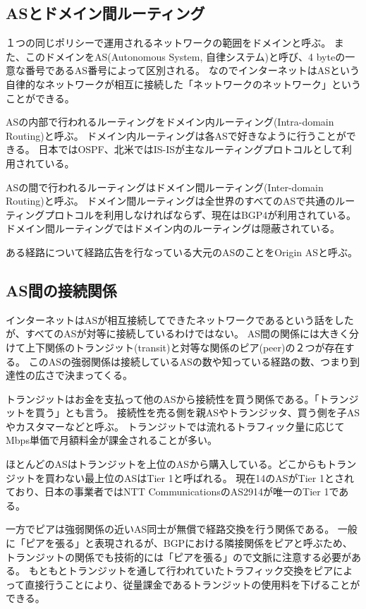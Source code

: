 \subsection{ASとドメイン間ルーティング}

１つの同じポリシーで運用されるネットワークの範囲をドメインと呼ぶ。
また、このドメインをAS(Autonomous System, 自律システム)と呼び、4 byteの一意な番号であるAS番号によって区別される。
なのでインターネットはASという自律的なネットワークが相互に接続した「ネットワークのネットワーク」ということができる。

ASの内部で行われるルーティングをドメイン内ルーティング(Intra-domain Routing)と呼ぶ。
ドメイン内ルーティングは各ASで好きなように行うことができる。
日本ではOSPF、北米ではIS-ISが主なルーティングプロトコルとして利用されている。

ASの間で行われるルーティングはドメイン間ルーティング(Inter-domain Routing)と呼ぶ。
ドメイン間ルーティングは全世界のすべてのASで共通のルーティングプロトコルを利用しなければならず、現在はBGP4が利用されている。
ドメイン間ルーティングではドメイン内のルーティングは隠蔽されている。

ある経路について経路広告を行なっている大元のASのことをOrigin ASと呼ぶ。

\subsection{AS間の接続関係}

インターネットはASが相互接続してできたネットワークであるという話をしたが、すべてのASが対等に接続しているわけではない。
AS間の関係には大きく分けて上下関係のトランジット(transit)と対等な関係のピア(peer)の２つが存在する。
このASの強弱関係は接続しているASの数や知っている経路の数、つまり到達性の広さで決まってくる。

トランジットはお金を支払って他のASから接続性を買う関係である。「トランジットを買う」とも言う。
接続性を売る側を親ASやトランジッタ、買う側を子ASやカスタマーなどと呼ぶ。
トランジットでは流れるトラフィック量に応じてMbps単価で月額料金が課金されることが多い。

ほとんどのASはトランジットを上位のASから購入している。どこからもトランジットを買わない最上位のASはTier 1と呼ばれる。
現在14のASがTier 1とされており、日本の事業者ではNTT CommunicationsのAS2914が唯一のTier 1である。

一方でピアは強弱関係の近いAS同士が無償で経路交換を行う関係である。
一般に「ピアを張る」と表現されるが、BGPにおける隣接関係をピアと呼ぶため、トランジットの関係でも技術的には「ピアを張る」ので文脈に注意する必要がある。
もともとトランジットを通して行われていたトラフィック交換をピアによって直接行うことにより、従量課金であるトランジットの使用料を下げることができる。

